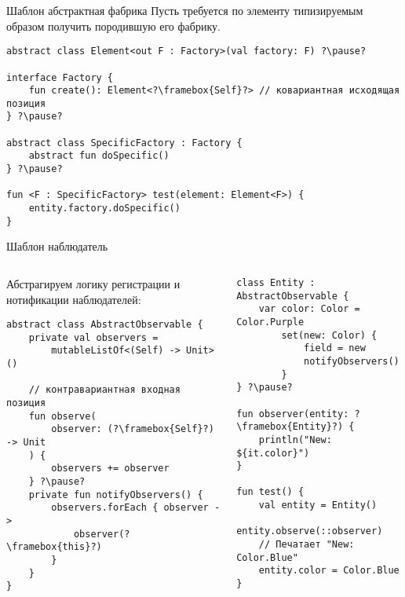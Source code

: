 \documentclass[aspectratio=169,usenames,dvipsnames]{beamer}
\begin{document}
    \begin{frame}[fragile]{Шаблон абстрактная фабрика}
        Пусть требуется по элементу типизируемым образом получить породившую его фабрику.

        \begin{verbatim}
abstract class Element<out F : Factory>(val factory: F) ?\pause?

interface Factory {
    fun create(): Element<?\framebox{Self}?> // ковариантная исходящая позиция
} ?\pause?

abstract class SpecificFactory : Factory {
    abstract fun doSpecific()
} ?\pause?

fun <F : SpecificFactory> test(element: Element<F>) {
    entity.factory.doSpecific()
}
        \end{verbatim}
    \end{frame}

    \begin{frame}[fragile]{Шаблон наблюдатель}
        \begin{columns}
            \begin{column}{0.48\textwidth}
                Абстрагируем логику регистрации и нотификации наблюдателей:
                \begin{verbatim}
abstract class AbstractObservable {
    private val observers =
        mutableListOf<(Self) -> Unit>()

    // контравариантная входная позиция
    fun observe(
        observer: (?\framebox{Self}?) -> Unit
    ) {
        observers += observer
    } ?\pause?
    private fun notifyObservers() {
        observers.forEach { observer ->
            observer(?\framebox{this}?)
        }
    }
}
                \end{verbatim}
            \end{column}
            \pause
            \begin{column}{0.49\textwidth}
                \vspace{-0.5em}
                \begin{verbatim}
class Entity : AbstractObservable {
    var color: Color = Color.Purple
        set(new: Color) {
            field = new
            notifyObservers()
        }
} ?\pause?

fun observer(entity: ?\framebox{Entity}?) {
    println("New: ${it.color}")
}

fun test() {
    val entity = Entity()
    entity.observe(::observer)
    // Печатает "New: Color.Blue"
    entity.color = Color.Blue
}
                \end{verbatim}
            \end{column}
        \end{columns}
    \end{frame}
\end{document}
